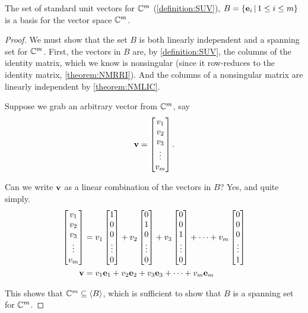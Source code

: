 \documentclass{ximera}
\begin{document}
\begin{theorem}
  \label{theorem:SUVB}

  The set of standard unit vectors for $\mathbb{C}^{m}$
  (\ref{definition:SUV}), $B=\left\lbrace\mathbf{e}_i\,\middle|\,1\leq i\leq m\right\rbrace$ is
  a basis for the vector space $\mathbb{C}^{m}$.

  \begin{proof}
    We must show that the set $B$ is both linearly independent and a
    spanning set for $\mathbb{C}^{m}$.  First, the vectors in $B$ are, by
    \ref{definition:SUV}, the columns of the identity matrix, which we
    know is nonsingular (since it row-reduces to the identity matrix,
    \ref{theorem:NMRRI}).  And the columns of a nonsingular matrix are
    linearly independent by \ref{theorem:NMLIC}.

    Suppose we grab an arbitrary vector from $\mathbb{C}^{m}$, say
    \[
      \mathbf{v}=\begin{bmatrix}v_1\\v_2\\v_3\\\vdots\\v_m\end{bmatrix}.
    \]

    Can we write $\mathbf{v}$ as a linear combination of the vectors in $B$?  Yes, and quite simply.
    \begin{align*}
      \begin{bmatrix}v_1\\v_2\\v_3\\\vdots\\v_m\end{bmatrix}&=
                                              v_1\begin{bmatrix}1\\0\\0\\\vdots\\0\end{bmatrix}+
      v_2\begin{bmatrix}0\\1\\0\\\vdots\\0\end{bmatrix}+
      v_3\begin{bmatrix}0\\0\\1\\\vdots\\0\end{bmatrix}+
      \cdots+
      v_m\begin{bmatrix}0\\0\\0\\\vdots\\1\end{bmatrix}\\
      \mathbf{v}&=v_1\mathbf{e}_1+v_2\mathbf{e}_2+v_3\mathbf{e}_3+\cdots+v_m\mathbf{e}_m
    \end{align*}
    
    This shows that $\mathbb{C}^{m}\subseteq\left\langle B\right\rangle$, which is sufficient to show that $B$ is a spanning set for $\mathbb{C}^{m}$.
  \end{proof}
\end{theorem}
\end{document}
